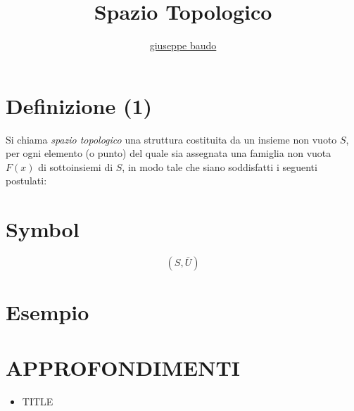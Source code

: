 \documentclass[a4paper,10pt]{article}
\title{Spazio Topologico}
\author{\href{http://www.baudo.hol.es}{giuseppe baudo}}
\begin{document}
\maketitle

\section{Definizione (1)}
Si chiama \textit{spazio topologico} una struttura costituita da un insieme non vuoto $S$, per ogni elemento (o punto) del quale sia assegnata una famiglia non vuota
$F(x)$ di sottoinsiemi di $S$, in modo tale che siano soddisfatti i seguenti postulati:

\section{Symbol}
\[
 (S, \bar{U})
\]

\section{Esempio}

\section{APPROFONDIMENTI}
\begin{itemize}
 \item TITLE
\end{itemize}
\end{document}
